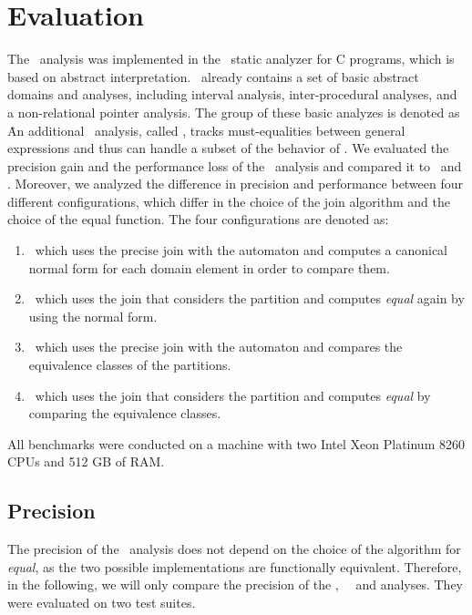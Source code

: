 \chapter{Evaluation}\label{chapter:evaluation}


The \cpo\ analysis was implemented in the \goblint\ static analyzer for C programs, which is based on abstract interpretation.
\goblint\ already contains a set of basic abstract domains and analyses,
including interval analysis, inter-procedural analyses, and a non-relational pointer analysis.
The group of these basic analyzes is denoted as \base\.
An additional \goblint\ analysis, called \vareq, tracks must-equalities between general expressions
and thus can handle a subset of the behavior of \cpo.
We evaluated the precision gain and the performance loss of the \cpo\ analysis and compared it to \base\ and \vareq.
Moreover, we analyzed the difference in precision and performance between four different
configurations, which differ in the choice of the join algorithm and the choice of the equal function.
The four configurations are denoted as:
\begin{enumerate}
    \item \cpou\, which uses the precise join with the automaton and computes a canonical normal form for each domain element in order to compare them.
    \item \cpod\, which uses the join that considers the partition and computes \emph{equal} again by using the normal form.
    \item \cpot\, which uses the precise join with the automaton and compares the equivalence classes of the partitions.
    \item \cpoq\, which uses the join that considers the partition and computes \emph{equal} by comparing the equivalence classes.
\end{enumerate}
All benchmarks were conducted on a machine with two Intel Xeon Platinum 8260 CPUs and 512 GB of RAM.

\section{Precision}

The precision of the \cpo\ analysis does not depend on the choice of the algorithm for \emph{equal}, as the two possible implementations are functionally equivalent.
Therefore, in the following, we will only compare the precision of the \cpou, \cpod\, \base\, and \vareq analyses.
They were evaluated on two test suites.

